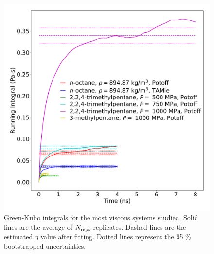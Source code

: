 \documentclass[preprint,review,11pt]{elsarticle}
\begin{document}
    \begin{figure}[htb!]
    	\centering
    	\includegraphics[width=5.2in]{most_viscous_systems.pdf}
    	\caption{Green-Kubo integrals for the most viscous systems studied. Solid lines are the average of $N_{\rm reps}$ replicates. Dashed lines are the estimated $\eta$ value after fitting. Dotted lines represent the 95 \% bootstrapped uncertainties.}
    	\label{fig:most_viscous}
    \end{figure} 
    
    
    
%    
%    
	
\end{document}
